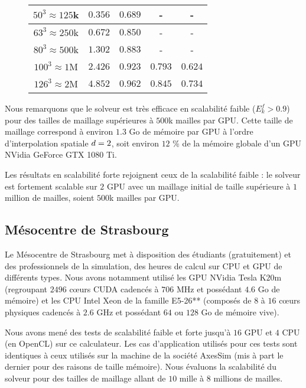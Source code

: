 \begin{figure}[!h]
\begin{center}
{\begin{tabular}{|c|c|c|c|c|}
			$50^3 \approx 125$k & $0.356$ & $0.689$ & - & - \\	\hline
			$63^3 \approx 250$k & $0.672$ & $0.850$ & - & - \\	\hline
			$80^3 \approx 500$k & $1.302$ & $0.883$ & - & - \\	\hline
			$100^3 \approx 1$M & $2.426$ & $0.923$ & $0.793$ & $0.624$ \\	\hline
			$126^3 \approx 2$M & $4.852$ & $0.962$ & $0.845$ & $0.734$ \\	\hline
		\end{tabular}
		}
	\end{center}
\end{figure}




Nous remarquons que le solveur est très efficace en scalabilité faible ($E_k^f > 0.9$)
pour des tailles de maillage supérieures à $500$k mailles par GPU.
Cette taille de maillage correspond à environ $1.3$ Go de mémoire par GPU
à l'ordre d'interpolation spatiale $d = 2$, soit environ $12$ \% de la mémoire
globale d'un GPU NVidia GeForce GTX 1080 Ti.

Les résultats en scalabilité forte rejoignent ceux de la scalabilité faible :
le solveur est fortement scalable sur $2$ GPU avec un maillage
initial de taille supérieure à $1$ million de mailles, soient $500$k mailles
par GPU.
\\


\subsection{Mésocentre de Strasbourg}
\label{ssect:mesocentre}


Le Mésocentre de Strasbourg met à disposition des étudiants (gratuitement)
et des professionnels de la simulation, des heures de calcul
sur CPU et GPU de différents types.
Nous avons notamment utilisé les GPU NVidia Tesla K$20$m (regroupant
$2496$ cœurs CUDA cadencés à $706$ MHz et possédant $4.6$ Go de mémoire) et les
CPU Intel Xeon de la famille E5-26** (composés de $8$ à $16$ cœurs physiques
cadencés à $2.6$ GHz et possédant $64$ ou $128$ Go de mémoire vive).

Nous avons mené des tests de scalabilité faible et forte
jusqu'à $16$ GPU et $4$ CPU (en OpenCL) sur ce calculateur.
Les cas d'application utilisés pour ces tests sont identiques
à ceux utilisés sur la machine de la société AxesSim (mis à part le dernier
pour des raisons de taille mémoire).
Nous évaluons la scalabilité du solveur
pour des tailles de maillage allant de $10$ mille à $8$ millions de mailles.

